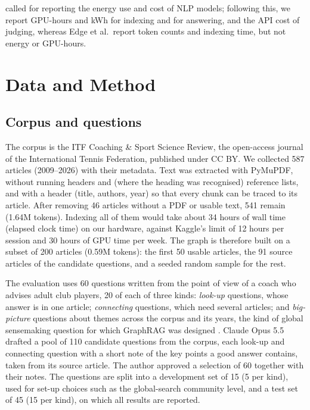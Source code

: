 \documentclass{article}
\begin{document}
\citet{strubell2019energy} called for reporting the energy use and cost of NLP models;
following this, we report GPU-hours and kWh for indexing and for answering, and the API cost of judging, whereas
Edge et al.\ report token counts and indexing time, but not energy or GPU-hours.

\section{Data and Method}
\label{sec:method}


\subsection{Corpus and questions}
\label{sec:corpus}
The corpus is the ITF Coaching \& Sport Science Review, the open-access journal of the International
Tennis Federation, published under CC BY. We collected 587 articles (2009--2026) with their metadata.
Text was extracted with PyMuPDF, without running headers and (where the heading was recognised) reference lists, and with a header
(title, authors, year) so that every chunk can be traced to its article. After removing 46 articles
without a PDF or usable text, 541 remain (1.64M tokens). Indexing all of them would take about 34 hours of wall time (elapsed clock time)
on our hardware, against Kaggle's limit of 12 hours per session and 30 hours of GPU time per week. The graph is therefore built on a subset of 200 articles (0.59M tokens): the
first 50 usable articles, the 91 source articles of the candidate questions, and a seeded random
sample for the rest.

The evaluation uses 60 questions written from the point of view of a coach who advises adult club
players, 20 of each of three kinds: \emph{look-up} questions, whose answer is in one article;
\emph{connecting} questions, which need several articles; and \emph{big-picture} questions about
themes across the corpus and its years, the kind of global sensemaking question for which GraphRAG
was designed \cite{edge2024local}. Claude Opus 5.5 drafted a pool of 110 candidate questions from the corpus, each look-up and connecting
question with a short note of the key points a good answer contains, taken from its source article.
The author approved a selection of 60 together with their notes. The questions are
split into a development set of 15 (5 per kind), used for set-up choices such as the
global-search community level,
and a test set of 45 (15 per kind), on which all results are reported.
\end{document}
